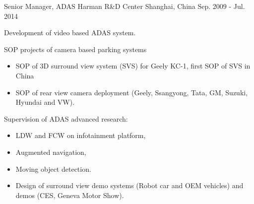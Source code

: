 \documentclass[../cv.tex]{subfiles}
\begin{document}
\begin{cventries}
	\cventry
	{Senior Manager, ADAS} %
	{Harman R\&D Center} %
	{Shanghai, China} %
	{Sep. 2009 - Jul. 2014} %
	{
		\begin{cvitems}
			\item Development of video based ADAS system.
			\item SOP projects of camera based parking systems
			\begin{itemize}
				\item SOP of 3D surround view system (SVS) for Geely KC-1, first SOP of SVS in China
				\item SOP of rear view camera deployment (Geely, Ssangyong, Tata, GM, Suzuki, Hyundai and VW).
			\end{itemize}
			\item Supervision of ADAS advanced research:
			\begin{itemize}
				\item LDW and FCW on infotainment platform,
				\item Augmented navigation,
				\item Moving object detection.
				\item Design of surround view demo systems (Robot car and OEM vehicles) and demos (CES, Geneva Motor Show).
			\end{itemize}
		\end{cvitems}
	}
\end{cventries}
\end{document}

